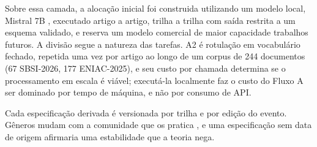 Sobre essa camada, a alocação inicial foi construida utilizando um modelo local, Mistral 7B \cite{mistral}, executado artigo a artigo, trilha a trilha com saída restrita a um esquema validado, e reserva um modelo comercial de maior capacidade trabalhos futuros. A divisão segue a natureza das tarefas. A2 é rotulação em vocabulário fechado, repetida uma vez por artigo ao longo de um corpus de 244 documentos (67 SBSI-2026, 177 ENIAC-2025), e seu custo por chamada determina se o processamento em escala é viável; executá-la localmente faz o custo do Fluxo A ser dominado por tempo de máquina, e não por consumo de API. 

Cada especificação derivada é versionada por trilha e por edição do evento. Gêneros mudam com a comunidade que os pratica \cite{GenresOrgComm}, e uma especificação sem data de origem afirmaria uma estabilidade que a teoria nega.






